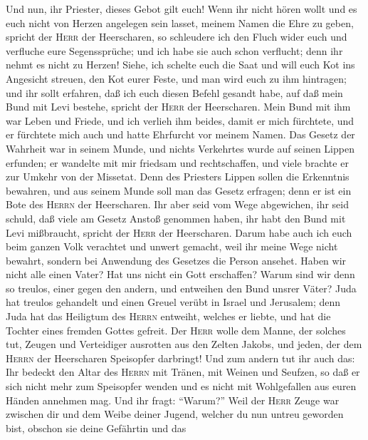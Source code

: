  Und nun, ihr Priester, dieses Gebot gilt euch!
 Wenn ihr nicht hören wollt und es euch nicht von Herzen
angelegen sein lasset, meinem Namen die Ehre zu geben, spricht der
\textsc{Herr} der Heerscharen, so schleudere ich den Fluch wider euch
und verfluche eure Segenssprüche; und ich habe sie auch schon verflucht;
denn ihr nehmt es nicht zu Herzen!  Siehe, ich schelte
euch die Saat und will euch Kot ins Angesicht streuen, den Kot eurer
Feste, und man wird euch zu ihm hintragen;  und ihr sollt
erfahren, daß ich euch diesen Befehl gesandt habe, auf daß mein Bund mit
Levi bestehe, spricht der \textsc{Herr} der Heerscharen. 
Mein Bund mit ihm war Leben und Friede, und ich verlieh ihm beides,
damit er mich fürchtete, und er fürchtete mich auch und hatte Ehrfurcht
vor meinem Namen.  Das Gesetz der Wahrheit war in seinem
Munde, und nichts Verkehrtes wurde auf seinen Lippen erfunden; er
wandelte mit mir friedsam und rechtschaffen, und viele brachte er zur
Umkehr von der Missetat.  Denn des Priesters Lippen sollen
die Erkenntnis bewahren, und aus seinem Munde soll man das Gesetz
erfragen; denn er ist ein Bote des \textsc{Herrn} der Heerscharen.
 Ihr aber seid vom Wege abgewichen, ihr seid schuld, daß
viele am Gesetz Anstoß genommen haben, ihr habt den Bund mit Levi
mißbraucht, spricht der \textsc{Herr} der Heerscharen. 
Darum habe auch ich euch beim ganzen Volk verachtet und unwert gemacht,
weil ihr meine Wege nicht bewahrt, sondern bei Anwendung des Gesetzes
die Person ansehet.  Haben wir nicht alle einen Vater?
Hat uns nicht ein Gott erschaffen? Warum sind wir denn so treulos, einer
gegen den andern, und entweihen den Bund unsrer Väter? 
Juda hat treulos gehandelt und einen Greuel verübt in Israel und
Jerusalem; denn Juda hat das Heiligtum des \textsc{Herrn} entweiht,
welches er liebte, und hat die Tochter eines fremden Gottes gefreit.
 Der \textsc{Herr} wolle dem Manne, der solches tut,
Zeugen und Verteidiger ausrotten aus den Zelten Jakobs, und jeden, der
dem \textsc{Herrn} der Heerscharen Speisopfer darbringt! 
Und zum andern tut ihr auch das: Ihr bedeckt den Altar des
\textsc{Herrn} mit Tränen, mit Weinen und Seufzen, so daß er sich nicht
mehr zum Speisopfer wenden und es nicht mit Wohlgefallen aus euren
Händen annehmen mag.  Und ihr fragt: ``Warum?'' Weil der
\textsc{Herr} Zeuge war zwischen dir und dem Weibe deiner Jugend,
welcher du nun untreu geworden bist, obschon sie deine Gefährtin und das
